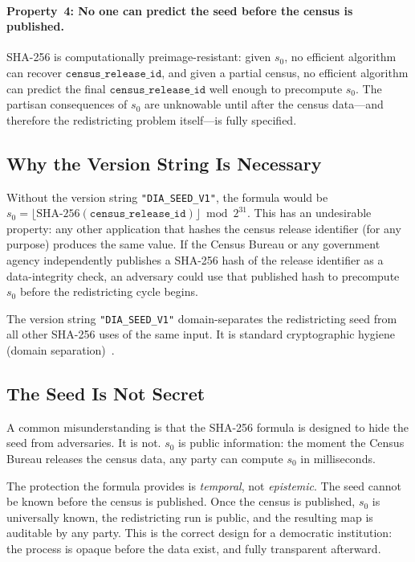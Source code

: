 \paragraph{Property~4: No one can predict the seed before the census is published.}
SHA-256 is computationally preimage-resistant: given $s_0$, no efficient
algorithm can recover $\mathtt{census\_release\_id}$, and given a partial
census, no efficient algorithm can predict the final
$\mathtt{census\_release\_id}$ well enough to precompute $s_0$.
The partisan consequences of $s_0$ are unknowable until after the census
data---and therefore the redistricting problem itself---is fully specified.

\subsection{Why the Version String Is Necessary}

Without the version string \texttt{"DIA\_SEED\_V1"}, the formula would be
$s_0 = \lfloor \mathrm{SHA\text{-}256}(\mathtt{census\_release\_id}) \rfloor
\bmod 2^{31}$.
This has an undesirable property: any other application that hashes the census
release identifier (for any purpose) produces the same value.
If the Census Bureau or any government agency independently publishes a SHA-256
hash of the release identifier as a data-integrity check, an adversary could
use that published hash to precompute $s_0$ before the redistricting cycle
begins.

The version string \texttt{"DIA\_SEED\_V1"} domain-separates the
redistricting seed from all other SHA-256 uses of the same input.
It is standard cryptographic hygiene (domain separation)~\citep{bernstein2019}.

\subsection{The Seed Is Not Secret}

A common misunderstanding is that the SHA-256 formula is designed to hide the
seed from adversaries.
It is not.
$s_0$ is public information: the moment the Census Bureau releases the census
data, any party can compute $s_0$ in milliseconds.

The protection the formula provides is \emph{temporal}, not \emph{epistemic}.
The seed cannot be known before the census is published.
Once the census is published, $s_0$ is universally known, the redistricting
run is public, and the resulting map is auditable by any party.
This is the correct design for a democratic institution: the process is opaque
before the data exist, and fully transparent afterward.

